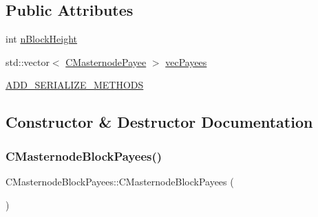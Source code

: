 \subsection*{Public Attributes}
\begin{DoxyCompactItemize}
\item 
int \mbox{\hyperlink{class_c_masternode_block_payees_ae7eae4dd466c444d7c41debcbcc402f1}{n\+Block\+Height}}
\item 
std\+::vector$<$ \mbox{\hyperlink{class_c_masternode_payee}{C\+Masternode\+Payee}} $>$ \mbox{\hyperlink{class_c_masternode_block_payees_a61f566bf72c56e12ccf1b3159c867c9d}{vec\+Payees}}
\item 
\mbox{\hyperlink{class_c_masternode_block_payees_ab596470ea981333cb3a905422c64eec1}{A\+D\+D\+\_\+\+S\+E\+R\+I\+A\+L\+I\+Z\+E\+\_\+\+M\+E\+T\+H\+O\+DS}}
\end{DoxyCompactItemize}


\subsection{Constructor \& Destructor Documentation}
\mbox{\label{class_c_masternode_block_payees_a57cf1c21d11f8bda7da5282632b9528c}} 
\subsubsection{\texorpdfstring{C\+Masternode\+Block\+Payees()}{CMasternodeBlockPayees()}\hspace{0.1cm}{\footnotesize\ttfamily [1/2]}}
{\footnotesize\ttfamily C\+Masternode\+Block\+Payees\+::\+C\+Masternode\+Block\+Payees (\begin{DoxyParamCaption}{ }\end{DoxyParamCaption})\hspace{0.3cm}{\ttfamily [inline]}}

\mbox{\label{class_c_masternode_block_payees_a0b181e78ae9b160c146bc9e8d12d44b5}} 
